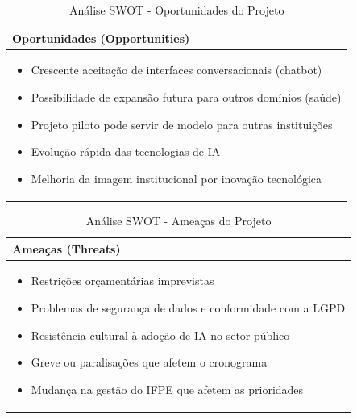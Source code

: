 \documentclass[12pt,a4paper]{article}
\begin{document}
\begin{table}[htbp]
\centering
\begin{tcolorbox}[enhanced, colback=blue!5, colframe=blue!40!black, arc=3mm, boxrule=0.5pt, width=0.85\textwidth]
\begin{tabular}{|p{12cm}|}
\hline
\rowcolor{blue!10}\large \textbf{Oportunidades (Opportunities)} \\
\hline
\begin{itemize}\setlength{\itemsep}{1pt}
\item Crescente aceitação de interfaces conversacionais (chatbot)
\item Possibilidade de expansão futura para outros domínios (saúde)
\item Projeto piloto pode servir de modelo para outras instituições
\item Evolução rápida das tecnologias de IA
\item Melhoria da imagem institucional por inovação tecnológica
\end{itemize} \\
\hline
\end{tabular}
\end{tcolorbox}
\caption{Análise SWOT - Oportunidades do Projeto}
\end{table}

\begin{table}[htbp]
\centering
\begin{tcolorbox}[enhanced, colback=yellow!5, colframe=yellow!40!black, arc=3mm, boxrule=0.5pt, width=0.85\textwidth]
\begin{tabular}{|p{12cm}|}
\hline
\rowcolor{yellow!10}\large \textbf{Ameaças (Threats)} \\
\hline
\begin{itemize}\setlength{\itemsep}{1pt}
\item Restrições orçamentárias imprevistas
\item Problemas de segurança de dados e conformidade com a LGPD
\item Resistência cultural à adoção de IA no setor público
\item Greve ou paralisações que afetem o cronograma
\item Mudança na gestão do IFPE que afetem as prioridades
\end{itemize} \\
\hline
\end{tabular}
\end{tcolorbox}
\caption{Análise SWOT - Ameaças do Projeto}
\end{table}
\end{document}

